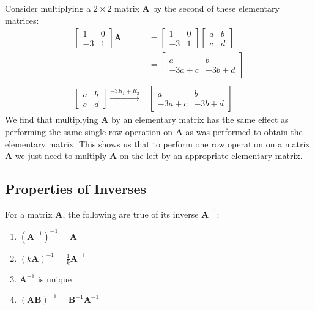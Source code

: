 \documentclass[11pt]{article}
\newcommand{\mat}[1]{\mathbf{#1}}
\begin{document}
Consider multiplying a $2 \times 2$ matrix $\mat{A}$ by the second of these elementary matrices:
\begin{align*}
\begin{bmatrix}1 & 0 \\ -3 & 1\end{bmatrix} \mat{A}
&=
\begin{bmatrix}1 & 0 \\ -3 & 1\end{bmatrix}
\begin{bmatrix}a & b \\ c & d\end{bmatrix}
\\
&= \begin{bmatrix}a & b \\ -3a+c & -3b+d\end{bmatrix}
\\
\\
\begin{bmatrix}a & b \\ c & d\end{bmatrix}
\xrightarrow{-3 R_1 + R_2} &
\begin{bmatrix} a & b \\ -3a+c & -3b+d\end{bmatrix}
\end{align*}
We find that multiplying $\mat{A}$ by an elementary matrix has the same effect as performing the same single row operation on $\mat{A}$ as was performed to obtain the elementary matrix. This shows us that to perform one row operation on a matrix $\mat{A}$ we just need to multiply $\mat{A}$ on the left by an appropriate elementary matrix.

\subsection*{Properties of Inverses}
For a matrix $\mat{A}$, the following are true of its inverse $\mat{A}^{-1}$:
\begin{enumerate}
\item{
$\left( \mat{A}^{-1} \right)^{-1} = \mat{A}$
}
\item{
$\left( k \mat{A} \right)^{-1} = \frac{1}{k} \mat{A}^{-1}$
}
\item{
$\mat{A}^{-1}$ is unique
}
\item{
$\left(\mat{A} \mat{B}\right)^{-1} = \mat{B}^{-1} \mat{A}^{-1}$
}
\end{enumerate}
\end{document}
